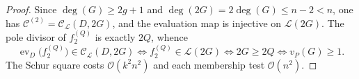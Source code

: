 \documentclass[10pt,a4paper]{amsart}
\begin{document}
\begin{proof}
Since $\deg(G) \geq 2g+1$ and $\deg(2G) = 2\deg(G) \leq n-2 < n$, one has $\mathcal{C}^{(2)} = \mathcal{C}_\mathscr{L}(D, 2G)$, and the evaluation map is injective on $\mathscr{L}(2G)$. The pole divisor of $f_2^{(Q)}$ is exactly $2Q$, whence
\[
\operatorname{ev}_D\bigl(f_2^{(Q)}\bigr) \in \mathcal{C}_\mathscr{L}(D,2G)
\iff f_2^{(Q)} \in \mathscr{L}(2G)
\iff 2G \geq 2Q
\iff v_P(G) \geq 1 .
\]
The Schur square costs $\mathcal{O}(k^2n^2)$ and each membership test $\mathcal{O}(n^2)$.
\end{proof}
\end{document}
